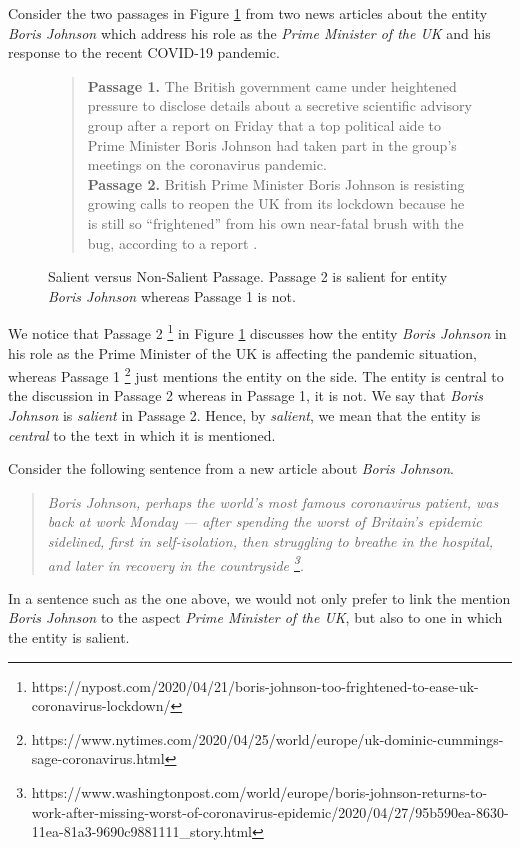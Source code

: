 Consider the two passages in Figure \ref{fig:Salience} from two news articles about the entity \textit{Boris Johnson} which address his role as the \textit{Prime Minister of the UK} and his response to the recent COVID-19 pandemic.
\begin{figure}[t]
    \centering
   \begin{quote}
\textbf{Passage 1.} The British government came under heightened pressure to disclose details about a secretive scientific advisory group after a report on Friday that a top political aide to Prime Minister Boris Johnson had taken part in the group’s meetings on the coronavirus pandemic. \\
\textbf{Passage 2.} British Prime Minister Boris Johnson is resisting growing calls to reopen the UK from its lockdown because he is still so “frightened” from his own near-fatal brush with the bug, according to a report .
\end{quote}
    \caption{Salient versus Non-Salient Passage. Passage 2 is salient for entity \textit{Boris Johnson} whereas Passage 1 is not.}
    \label{fig:Salience}
\end{figure}
We notice that Passage 2 \footnote{https://nypost.com/2020/04/21/boris-johnson-too-frightened-to-ease-uk-coronavirus-lockdown/} in Figure \ref{fig:Salience} discusses how the entity \textit{Boris Johnson} in his role as the Prime Minister of the UK is affecting the pandemic situation, whereas Passage 1 \footnote{https://www.nytimes.com/2020/04/25/world/europe/uk-dominic-cummings-sage-coronavirus.html} just mentions the entity on the side. The entity is central to the discussion in Passage 2 whereas in Passage 1, it is not. We say that \textit{Boris Johnson} is \textit{salient} in Passage 2. Hence, by \textit{salient}, we mean that the entity is \textit{central} to the text in which it is mentioned. 

Consider the following sentence from a new article about \textit{Boris Johnson}.

\begin{quote}
    \textit{Boris Johnson, perhaps the world's most famous coronavirus patient, was back at work Monday — after spending the worst of Britain's epidemic sidelined,
first in self-isolation, then struggling to breathe in the hospital, and later in recovery in the countryside \footnote{https://www.washingtonpost.com/world/europe/boris-johnson-returns-to-work-after-missing-worst-of-coronavirus-epidemic/2020/04/27/95b590ea-8630-11ea-81a3-9690c9881111_story.html}}.
\end{quote}

In a sentence such as the one above, we would not only prefer to link the mention \textit{Boris Johnson} to the aspect \textit{Prime Minister of the UK}, but also to one in which the entity is salient. 